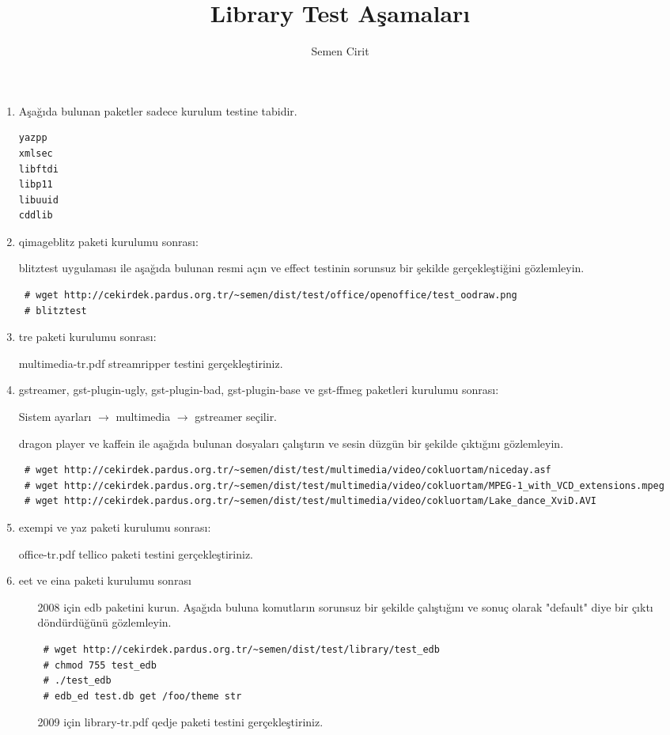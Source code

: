 \documentclass[a4paper,10pt]{article}
\title{Library Test Aşamaları}
\author{Semen Cirit}
\begin{document}
\maketitle
\begin{enumerate}
\item Aşağıda bulunan paketler sadece kurulum testine tabidir.
\begin{verbatim}
yazpp
xmlsec
libftdi
libp11
libuuid
cddlib
\end{verbatim}

\item qimageblitz paketi kurulumu sonrası:

blitztest uygulaması ile aşağıda bulunan resmi açın ve effect testinin sorunsuz bir şekilde gerçekleştiğini gözlemleyin.
\begin{verbatim}
 # wget http://cekirdek.pardus.org.tr/~semen/dist/test/office/openoffice/test_oodraw.png
 # blitztest
\end{verbatim}


\item tre paketi kurulumu sonrası:

multimedia-tr.pdf streamripper testini gerçekleştiriniz.

\item gstreamer, gst-plugin-ugly, gst-plugin-bad, gst-plugin-base ve gst-ffmeg paketleri kurulumu sonrası:

Sistem ayarları $\rightarrow$ multimedia $\rightarrow$ gstreamer seçilir. 

dragon player ve kaffein ile aşağıda bulunan dosyaları çalıştırın ve sesin düzgün bir şekilde çıktığını gözlemleyin.
\begin{verbatim}
 # wget http://cekirdek.pardus.org.tr/~semen/dist/test/multimedia/video/cokluortam/niceday.asf
 # wget http://cekirdek.pardus.org.tr/~semen/dist/test/multimedia/video/cokluortam/MPEG-1_with_VCD_extensions.mpeg
 # wget http://cekirdek.pardus.org.tr/~semen/dist/test/multimedia/video/cokluortam/Lake_dance_XviD.AVI
\end{verbatim}

\item exempi ve yaz paketi kurulumu sonrası:

office-tr.pdf tellico paketi testini gerçekleştiriniz.

\item eet ve eina paketi kurulumu sonrası
\begin{itemize}
 \item [2008 için] edb paketini kurun. Aşağıda buluna komutların sorunsuz bir şekilde çalıştığını ve sonuç olarak "default" diye bir çıktı döndürdüğünü gözlemleyin.
\begin{verbatim}
 # wget http://cekirdek.pardus.org.tr/~semen/dist/test/library/test_edb
 # chmod 755 test_edb
 # ./test_edb
 # edb_ed test.db get /foo/theme str
\end{verbatim}
\item [2009 için] library-tr.pdf qedje paketi testini gerçekleştiriniz.
\end{itemize}


\end{enumerate}
\end{document}
